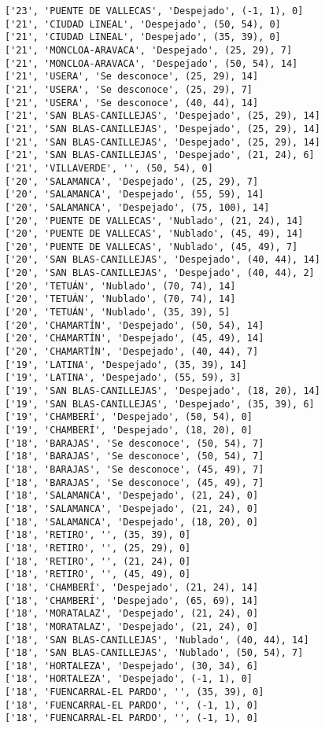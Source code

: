 \documentclass[11pt]{article}
\begin{document}
\begin{Verbatim}[commandchars=\\\{\}]
['23', 'PUENTE DE VALLECAS', 'Despejado', (-1, 1), 0]
['21', 'CIUDAD LINEAL', 'Despejado', (50, 54), 0]
['21', 'CIUDAD LINEAL', 'Despejado', (35, 39), 0]
['21', 'MONCLOA-ARAVACA', 'Despejado', (25, 29), 7]
['21', 'MONCLOA-ARAVACA', 'Despejado', (50, 54), 14]
['21', 'USERA', 'Se desconoce', (25, 29), 14]
['21', 'USERA', 'Se desconoce', (25, 29), 7]
['21', 'USERA', 'Se desconoce', (40, 44), 14]
['21', 'SAN BLAS-CANILLEJAS', 'Despejado', (25, 29), 14]
['21', 'SAN BLAS-CANILLEJAS', 'Despejado', (25, 29), 14]
['21', 'SAN BLAS-CANILLEJAS', 'Despejado', (25, 29), 14]
['21', 'SAN BLAS-CANILLEJAS', 'Despejado', (21, 24), 6]
['21', 'VILLAVERDE', '', (50, 54), 0]
['20', 'SALAMANCA', 'Despejado', (25, 29), 7]
['20', 'SALAMANCA', 'Despejado', (55, 59), 14]
['20', 'SALAMANCA', 'Despejado', (75, 100), 14]
['20', 'PUENTE DE VALLECAS', 'Nublado', (21, 24), 14]
['20', 'PUENTE DE VALLECAS', 'Nublado', (45, 49), 14]
['20', 'PUENTE DE VALLECAS', 'Nublado', (45, 49), 7]
['20', 'SAN BLAS-CANILLEJAS', 'Despejado', (40, 44), 14]
['20', 'SAN BLAS-CANILLEJAS', 'Despejado', (40, 44), 2]
['20', 'TETUÁN', 'Nublado', (70, 74), 14]
['20', 'TETUÁN', 'Nublado', (70, 74), 14]
['20', 'TETUÁN', 'Nublado', (35, 39), 5]
['20', 'CHAMARTÍN', 'Despejado', (50, 54), 14]
['20', 'CHAMARTÍN', 'Despejado', (45, 49), 14]
['20', 'CHAMARTÍN', 'Despejado', (40, 44), 7]
['19', 'LATINA', 'Despejado', (35, 39), 14]
['19', 'LATINA', 'Despejado', (55, 59), 3]
['19', 'SAN BLAS-CANILLEJAS', 'Despejado', (18, 20), 14]
['19', 'SAN BLAS-CANILLEJAS', 'Despejado', (35, 39), 6]
['19', 'CHAMBERÍ', 'Despejado', (50, 54), 0]
['19', 'CHAMBERÍ', 'Despejado', (18, 20), 0]
['18', 'BARAJAS', 'Se desconoce', (50, 54), 7]
['18', 'BARAJAS', 'Se desconoce', (50, 54), 7]
['18', 'BARAJAS', 'Se desconoce', (45, 49), 7]
['18', 'BARAJAS', 'Se desconoce', (45, 49), 7]
['18', 'SALAMANCA', 'Despejado', (21, 24), 0]
['18', 'SALAMANCA', 'Despejado', (21, 24), 0]
['18', 'SALAMANCA', 'Despejado', (18, 20), 0]
['18', 'RETIRO', '', (35, 39), 0]
['18', 'RETIRO', '', (25, 29), 0]
['18', 'RETIRO', '', (21, 24), 0]
['18', 'RETIRO', '', (45, 49), 0]
['18', 'CHAMBERÍ', 'Despejado', (21, 24), 14]
['18', 'CHAMBERÍ', 'Despejado', (65, 69), 14]
['18', 'MORATALAZ', 'Despejado', (21, 24), 0]
['18', 'MORATALAZ', 'Despejado', (21, 24), 0]
['18', 'SAN BLAS-CANILLEJAS', 'Nublado', (40, 44), 14]
['18', 'SAN BLAS-CANILLEJAS', 'Nublado', (50, 54), 7]
['18', 'HORTALEZA', 'Despejado', (30, 34), 6]
['18', 'HORTALEZA', 'Despejado', (-1, 1), 0]
['18', 'FUENCARRAL-EL PARDO', '', (35, 39), 0]
['18', 'FUENCARRAL-EL PARDO', '', (-1, 1), 0]
['18', 'FUENCARRAL-EL PARDO', '', (-1, 1), 0]

\end{Verbatim}
\end{document}
